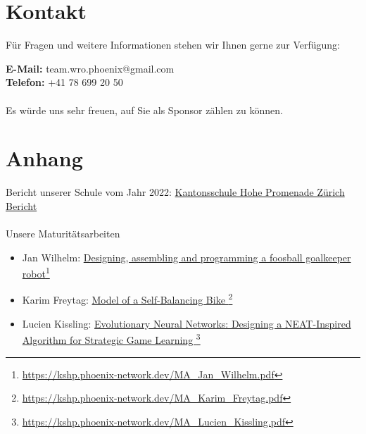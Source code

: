 \documentclass[11pt]{article}
\begin{document}
    \section*{Kontakt}

    Für Fragen und weitere Informationen stehen wir Ihnen gerne zur Verfügung:

    \noindent \textbf{E-Mail:} team.wro.phoenix@gmail.com\\
    \textbf{Telefon:} +41 78 699 20 50\\
    \vspace{0.2cm}\\
    \noindent Es würde uns sehr freuen, auf Sie als Sponsor zählen zu können.
    \newpage

    \section*{Anhang}
    Bericht unserer Schule vom Jahr 2022:
    \href{https://kshp.ch/buchstabenseiten/k-wie-konzert-2-1}{Kantonsschule Hohe Promenade Zürich Bericht}
    \\ \\
    Unsere Maturitätsarbeiten
    \begin{itemize}[label={}]
        \item Jan Wilhelm: \href{https://kshp.phoenix-network.dev/MA_Jan_Wilhelm.pdf}{Designing, assembling and programming
        a foosball goalkeeper robot}\footnote{\href{https://kshp.phoenix-network.dev/MA_Jan_Wilhelm.pdf}{https://kshp.phoenix-network.dev/MA\_Jan\_Wilhelm.pdf}}
        \item Karim Freytag: \href{https://kshp.phoenix-network.dev/MA_Karim_Freytag.pdf}{Model of a Self-Balancing Bike
        }\footnote{\href{https://kshp.phoenix-network.dev/MA_Karim_Freytag.pdf}{https://kshp.phoenix-network.dev/MA\_Karim\_Freytag.pdf}}
        \item Lucien Kissling: \href{https://kshp.phoenix-network.dev/MA_Lucien_Kissling.pdf}{Evolutionary Neural Networks:
        Designing a NEAT-Inspired Algorithm
        for Strategic Game Learning
        }\footnote{\href{https://kshp.phoenix-network.dev/MA_Lucien_Kissling.pdf}{https://kshp.phoenix-network.dev/MA\_Lucien\_Kissling.pdf}}
    \end{itemize}


    \newpage
\end{document}
